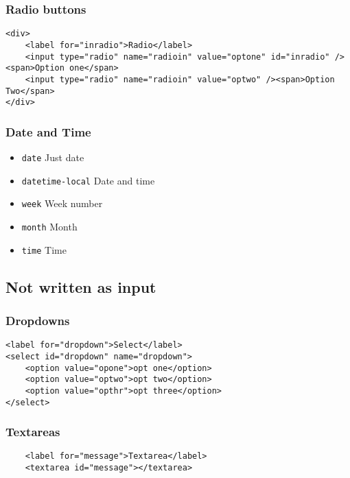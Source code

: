 \subsubsection{Radio buttons}

\begin{verbatim}
<div>
    <label for="inradio">Radio</label>
    <input type="radio" name="radioin" value="optone" id="inradio" /><span>Option one</span>
    <input type="radio" name="radioin" value="optwo" /><span>Option Two</span>
</div>
\end{verbatim}

\subsubsection{Date and Time}

\begin{itemize}
    \item \texttt{date} Just date
    \item \texttt{datetime-local} Date and time
    \item \texttt{week} Week number
    \item \texttt{month} Month
    \item \texttt{time} Time
\end{itemize}


\subsection{Not written as input}

\subsubsection{Dropdowns}

\begin{verbatim}
<label for="dropdown">Select</label>
<select id="dropdown" name="dropdown">
    <option value="opone">opt one</option>
    <option value="optwo">opt two</option>
    <option value="opthr">opt three</option>
</select>
\end{verbatim}

\subsubsection{Textareas}

\begin{verbatim}
    <label for="message">Textarea</label>
    <textarea id="message"></textarea>
\end{verbatim}


